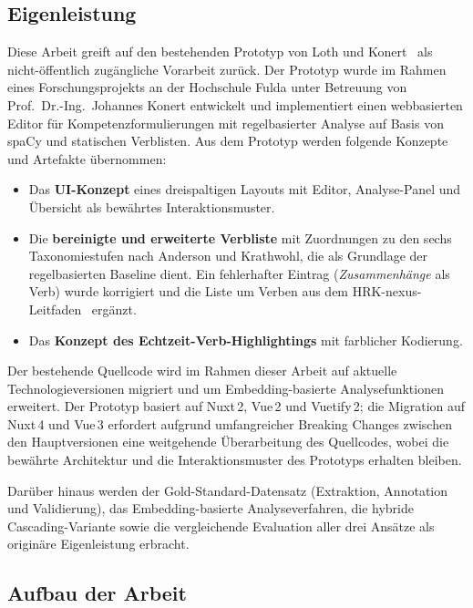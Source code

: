 %
\subsection{Eigenleistung}\label{sec:eigenleistung}

Diese Arbeit greift auf den bestehenden Prototyp von Loth und Konert~\cite{loth2022kompetenzeditor,loth2022masterprojekt} als nicht-öffentlich zugängliche Vorarbeit zurück.
Der Prototyp wurde im Rahmen eines Forschungsprojekts an der Hochschule Fulda unter Betreuung von Prof.\ Dr.-Ing.\ Johannes Konert entwickelt und implementiert einen webbasierten Editor für Kompetenzformulierungen mit regelbasierter Analyse auf Basis von spaCy und statischen Verblisten.
Aus dem Prototyp werden folgende Konzepte und Artefakte übernommen:

\begin{itemize}
    \item Das \textbf{UI-Konzept} eines dreispaltigen Layouts mit Editor, Analyse-Panel und Übersicht als bewährtes Interaktionsmuster.
    \item Die \textbf{bereinigte und erweiterte Verbliste} mit Zuordnungen zu den sechs Taxonomiestufen nach Anderson und Krathwohl, die als Grundlage der regelbasierten Baseline dient. Ein fehlerhafter Eintrag (\emph{Zusammenhänge} als Verb) wurde korrigiert und die Liste um Verben aus dem HRK-nexus-Leitfaden~\cite{hrknexus2015lernergebnisse} ergänzt.
    \item Das \textbf{Konzept des Echtzeit-Verb-Highlightings} mit farblicher Kodierung.
\end{itemize}

Der bestehende Quellcode wird im Rahmen dieser Arbeit auf aktuelle Technologieversionen migriert und um Embedding-basierte Analysefunktionen erweitert.
Der Prototyp basiert auf Nuxt\,2, Vue\,2 und Vuetify\,2; die Migration auf Nuxt\,4 und Vue\,3 erfordert aufgrund umfangreicher Breaking Changes zwischen den Hauptversionen eine weitgehende Überarbeitung des Quellcodes, wobei die bewährte Architektur und die Interaktionsmuster des Prototyps erhalten bleiben.

Darüber hinaus werden der Gold-Standard-Datensatz (Extraktion, Annotation und Validierung), das Embedding-basierte Analyseverfahren, die hybride Cascading-Variante sowie die vergleichende Evaluation aller drei Ansätze als originäre Eigenleistung erbracht.

%
\subsection{Aufbau der Arbeit}\label{sec:aufbau}


